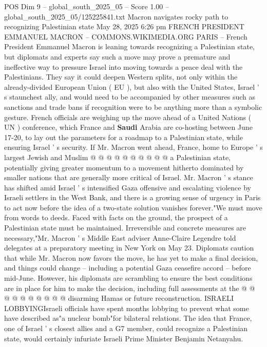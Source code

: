 \begin{textsample}{POS Dim 9 – global\_south\_2025\_05 – Score 1.00 – global\_south\_2025\_05/125225841.txt}  \label{ex:f9_pos_220}
Macron navigates rocky path to recognizing Palestinian state May 28, 2025 6:26 pm FRENCH PRESIDENT EMMANUEL MACRON -- COMMONS.WIKIMEDIA.ORG PARIS -- French President Emmanuel Macron is leaning towards recognizing a Palestinian state, but diplomats and experts say such a move may prove a premature and ineffective way to pressure Israel into moving towards a peace deal with the Palestinians.
They say it could deepen Western splits, not only within the already-divided European Union ( EU ), but also with the United States, Israel ' s staunchest ally, and would need to be accompanied by other measures such as sanctions and trade bans if recognition were to be anything more than a symbolic gesture.
French officials are weighing up the move ahead of a United Nations ( UN ) conference, which France and \textbf{Saudi} Arabia are co-hosting between June 17-20, to lay out the parameters for a roadmap to a Palestinian state, while ensuring Israel ' s security.
If Mr.
Macron went ahead, France, home to Europe ' s largest Jewish and Muslim @ @ @ @ @ @ @ @ @ @ a Palestinian state, potentially giving greater momentum to a movement hitherto dominated by smaller nations that are generally more critical of Israel.
Mr.
Macron ' s stance has shifted amid Israel ' s intensified Gaza offensive and escalating violence by Israeli settlers in the West Bank, and there is a growing sense of urgency in Paris to act now before the idea of a two-state solution vanishes forever."We must move from words to deeds.
Faced with facts on the ground, the prospect of a Palestinian state must be maintained.
Irreversible and concrete measures are necessary,"Mr.
Macron ' s Middle East adviser Anne-Claire Legendre told delegates at a preparatory meeting in New York on May 23.
Diplomats caution that while Mr.
Macron now favors the move, he has yet to make a final decision, and things could change -- including a potential Gaza ceasefire accord -- before mid-June.
However, his diplomats are scrambling to ensure the best conditions are in place for him to make the decision, including full assessments at the @ @ @ @ @ @ @ @ @ @ disarming Hamas or future reconstruction.
ISRAELI LOBBYINGIsraeli officials have spent months lobbying to prevent what some have described as"a nuclear bomb"for bilateral relations.
The idea that France, one of Israel ' s closest allies and a G7 member, could recognize a Palestinian state, would certainly infuriate Israeli Prime Minister Benjamin Netanyahu.

\end{textsample}
